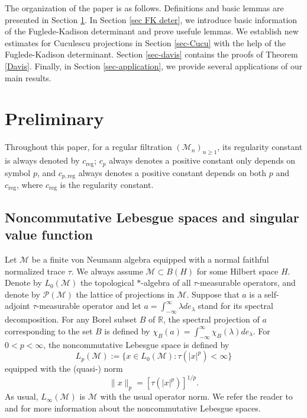 \documentclass[11]{amsart}
\numberwithin{equation}{section}
\newcommand{\M}{\mathcal{M}}
\begin{document}
The organization of the paper is as follows. Definitions and basic lemmas are presented in Section \ref{sec-pre}. In Section \ref{sec FK deter}, we introduce basic information of the Fuglede-Kadison determinant and prove usefule lemmas. We establish new estimates for Cuculescu projections in Section \ref{sec-Cucu} with the help of the Fuglede-Kadison determinant.  Section \ref{sec-davis} contains the proofs of Theorem \ref{Davis}. Finally, in Section \ref{sec-application}, we provide several applications of our main results. 







\section{Preliminary}\label{sec-pre}
Throughout this paper, for a regular filtration $(\M_n)_{n\geq1}$, its regularity constant is always denoted by $c_{\mathrm{reg}}$; $c_p$ always denotes a positive constant only depends on symbol $p$, and  $c_{p,\mathrm{reg}}$ always denotes a positive constant depends on both $p$ and $c_{\mathrm{reg}}$, where $c_{\mathrm{reg}}$ is the regularity constant.

\subsection{Noncommutative Lebesgue spaces  and singular value function}
Let $\mathcal M$ be a finite von Neumann algebra equipped with a normal faithful normalized  trace $\tau$.  We always assume $\mathcal{M}\subset B(H)$ for some Hilbert space $H$.
Denote by $L_0(\mathcal{M})$ the topological $*$-algebra of all $\tau$-measurable operators, and denote by $\mathcal{P}(\mathcal{M})$ the lattice of projections in $\mathcal{M}$. Suppose that $a$ is a self-adjoint $\tau$-measurable operator and let $a=\int_{-\infty}^{\infty} \lambda d e_{\lambda}$ stand for its spectral decomposition. For any Borel subset $B$ of $\mathbb{R}$, the spectral projection of $a$ corresponding to the set $B$ is defined by $\chi_B(a)=\int_{-\infty}^{\infty} \chi_B(\lambda) d e_{\lambda}$.  For $0<p<\infty$, the noncommutative Lebesgue space is defined by 
$$L_p(\M):=\{x\in L_0(\M): \tau(|x|^p)<\infty\}$$
equipped with the (quasi-) norm
$$\|x\|_p=[\tau(|x|^p)]^{1/p}.$$
As usual,  $L_\infty(\mathcal M)$ is $\mathcal {M}$ with the usual operator norm.  We refer the reader to \cite{Pi20031} and \cite{DdePS2023} for more information about the noncommutative Lebesgue spaces.
\end{document}
